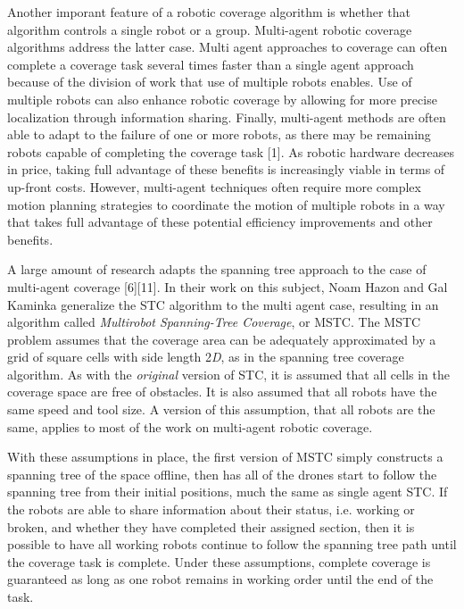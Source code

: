 Another imporant feature of a robotic coverage algorithm is whether that algorithm controls a single robot or a group. Multi-agent robotic coverage algorithms address the latter case. Multi agent approaches to coverage can often complete a coverage task several times faster than a single agent approach because of the division of work that use of multiple robots enables. Use of multiple robots can also enhance robotic coverage by allowing for more precise localization through information sharing. Finally, multi-agent methods are often able to adapt to the failure of one or more robots, as there may be remaining robots capable of completing the coverage task [1]. As robotic hardware decreases in price, taking full advantage of these benefits is increasingly viable in terms of up-front costs. However, multi-agent techniques often require more complex motion planning strategies to coordinate the motion of multiple robots in a way that takes full advantage of these potential efficiency improvements and other benefits.


A large amount of research adapts the spanning tree approach to the case of multi-agent coverage [6][11]. In their work on this subject, Noam Hazon and Gal Kaminka generalize the STC algorithm to the multi agent case, resulting in an algorithm called \textit{Multirobot Spanning-Tree Coverage}, or MSTC. The MSTC problem assumes that the coverage area can be adequately approximated by a grid of square cells with side length 2\textit{D}, as in the spanning tree coverage algorithm. As with the \textit{original} version of STC, it is assumed that all cells in the coverage space are free of obstacles. It is also assumed that all robots have the same speed and tool size. A version of this assumption, that all robots are the same, applies to most of the work on multi-agent robotic coverage.


With these assumptions in place, the first version of MSTC simply constructs a spanning tree of the space offline, then has all of the drones start to follow the spanning tree from their initial positions, much the same as single agent STC. If the robots are able to share information about their status, i.e. working or broken, and whether they have completed their assigned section, then it is possible to have all working robots continue to follow the spanning tree path until the coverage task is complete. Under these assumptions, complete coverage is guaranteed as long as one robot remains in working order until the end of the task.


